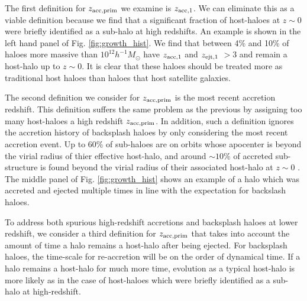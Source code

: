 \documentclass[a4paper,fleqn,usenatbib]{mnras}
\begin{document}
The first definition for $z_{\rm acc, prim}$ we examine is $z_{\rm acc,1}$.  We can eliminate this as a viable definition because we find that a significant fraction of host-haloes at $z\sim0$ were briefly identified as a sub-halo at high redshifts.  An example is shown in the left hand panel of Fig. \ref{fig:growth_hist}.  We find that between 4\% and 10\% of haloes more massive than $10^{12}h^{-1}M_{\odot}$ have $z_{\rm acc,1}$ and $z_{\rm ejt,1}$ $>3$ and remain a host-halo up to $z\sim0$.  It is clear that these haloes should be treated more as traditional host haloes than haloes that host satellite galaxies.   

The second definition we consider for $z_{\rm acc, prim}$ is the most recent accretion redshift.  This definition suffers the same problem as the previous by assigning too many host-haloes a high redshift $z_{\rm acc, prim}$.  In addition, such a definition ignores the accretion history of backsplash haloes by only considering the most recent accretion event.  Up to 60\% of sub-haloes are on orbits whose apocenter is beyond the virial radius of thier effective host-halo, and around $\sim 10\%$ of accreted sub-structure is found beyond the virial radius of their associated host-halo at $z\sim 0$ \citep{Lin:2003bi, Gill:2005ge, Sales:2007kq, Ludlow:2009ix,  Wetzel:2014up, vandenBosch:2016uv}.  The middle panel of Fig. \ref{fig:growth_hist} shows an example of a halo which was accreted and ejected multiple times in line with the expectation for backslash haloes.  

To address both spurious high-redshift accretions and backsplash haloes at lower redshift, we consider a third definition for $z_{\rm acc, prim}$ that takes into account the amount of time a halo remains a host-halo after being ejected.  For backsplash haloes, the time-scale for re-accretion will be on the order of dynamical time.  If a halo remains a host-halo for much more time, evolution as a typical host-halo is more likely as in the case of host-haloes which were briefly identified as a sub-halo at high-redshift.
\end{document}
